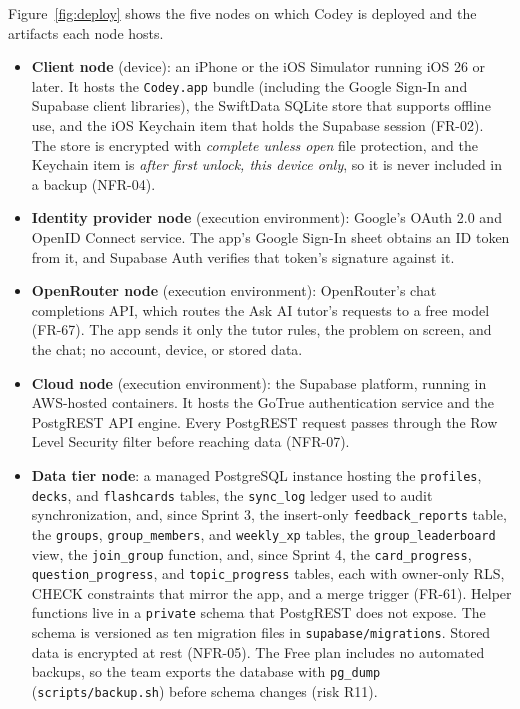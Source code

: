 \documentclass[12pt,letterpaper]{article}
\newcommand{\st}[1]{\guillemotleft#1\guillemotright}   %
\begin{document}
Figure~\ref{fig:deploy} shows the five nodes on which Codey is deployed and the
artifacts each node hosts.
\begin{itemize}
  \item \textbf{Client node} (\st{device}): an iPhone or the iOS Simulator running
        iOS 26 or later. It hosts the \texttt{Codey.app} bundle (including the Google
        Sign-In and Supabase client libraries), the SwiftData SQLite store that
        supports offline use, and the iOS Keychain item that holds the Supabase
        session (FR-02). The store is encrypted with \emph{complete unless open} file
        protection, and the Keychain item is \emph{after first unlock, this device
        only}, so it is never included in a backup (NFR-04).
  \item \textbf{Identity provider node} (\st{execution environment}): Google's OAuth
        2.0 and OpenID Connect service. The app's Google Sign-In sheet obtains an ID
        token from it, and Supabase Auth verifies that token's signature against it.
  \item \textbf{OpenRouter node} (\st{execution environment}): OpenRouter's chat
        completions API, which routes the Ask AI tutor's requests to a free model
        (FR-67). The app sends it only the tutor rules, the problem on screen, and the
        chat; no account, device, or stored data.
  \item \textbf{Cloud node} (\st{execution environment}): the Supabase platform,
        running in AWS-hosted containers. It hosts the GoTrue authentication service
        and the PostgREST API engine. Every PostgREST request passes through the Row
        Level Security filter before reaching data (NFR-07).
  \item \textbf{Data tier node}: a managed PostgreSQL instance hosting the
        \texttt{profiles}, \texttt{decks}, and \texttt{flashcards} tables, the
        \texttt{sync\_log} ledger used to audit synchronization, and, since Sprint 3,
        the insert-only \texttt{feedback\_reports} table, the \texttt{groups},
        \texttt{group\_members}, and \texttt{weekly\_xp} tables, the
        \texttt{group\_leaderboard} view, the \texttt{join\_group} function, and,
        since Sprint 4, the \texttt{card\_progress}, \texttt{question\_progress},
        and \texttt{topic\_progress} tables, each with owner-only RLS, CHECK
        constraints that mirror the app, and a merge trigger (FR-61). Helper
        functions live in a \texttt{private} schema that PostgREST does not expose. The
        schema is versioned as ten migration files in \texttt{supabase/migrations}. Stored data is
        encrypted at rest (NFR-05). The Free plan includes no automated backups, so
        the team exports the database with \texttt{pg\_dump}
        (\texttt{scripts/backup.sh}) before schema changes (risk R11).
\end{itemize}
\end{document}

